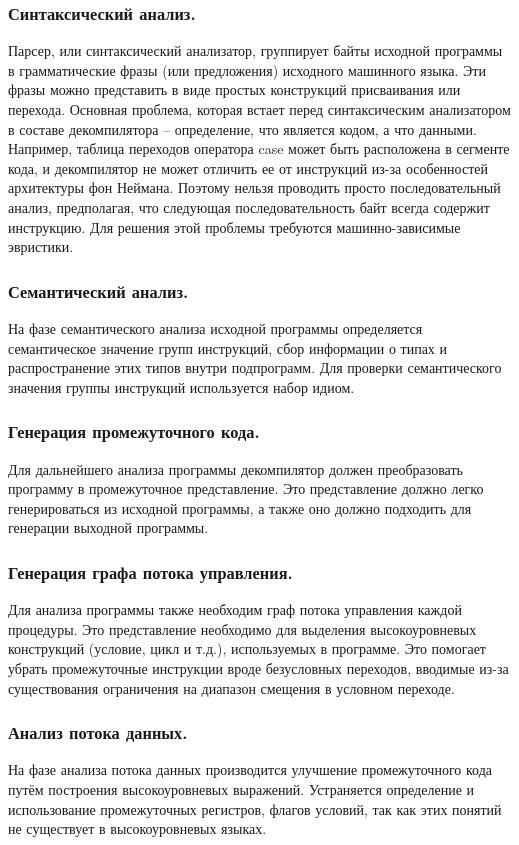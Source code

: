 \subsubsection*{Синтаксический анализ.} 
Парсер, или синтаксический анализатор, группирует байты исходной программы в грамматические фразы (или предложения) исходного машинного языка. Эти фразы можно представить в виде простых конструкций присваивания или перехода.
Основная проблема, которая встает перед синтаксическим анализатором в составе декомпилятора – определение, что является кодом, а что данными. Например, таблица переходов оператора case может быть расположена в сегменте кода, и декомпилятор не может отличить ее от инструкций из-за особенностей архитектуры фон Неймана. Поэтому нельзя проводить просто последовательный анализ, предполагая, что следующая последовательность байт всегда содержит инструкцию. Для решения этой проблемы требуются машинно-зависимые эвристики.
\subsubsection*{Семантический анализ.}
На фазе семантического анализа исходной программы определяется семантическое значение групп инструкций, сбор информации о типах и распространение этих типов внутри подпрограмм. Для проверки семантического значения группы инструкций используется набор идиом.
\subsubsection*{Генерация промежуточного кода.} 
Для дальнейшего анализа программы декомпилятор должен преобразовать программу в промежуточное представление. Это представление должно легко генерироваться из исходной программы, а также оно должно подходить для генерации выходной программы.
\subsubsection*{Генерация графа потока управления.}
Для анализа программы также необходим граф потока управления каждой процедуры. Это представление необходимо для выделения высокоуровневых конструкций (условие, цикл и т.д.), используемых в программе. Это помогает убрать промежуточные инструкции вроде безусловных переходов, вводимые из-за существования ограничения на диапазон смещения в условном переходе.
\subsubsection*{Анализ потока данных.} 
На фазе анализа потока данных производится улучшение промежуточного кода путём построения высокоуровневых выражений. Устраняется определение и использование промежуточных регистров, флагов условий, так как этих понятий не существует в высокоуровневых языках.
